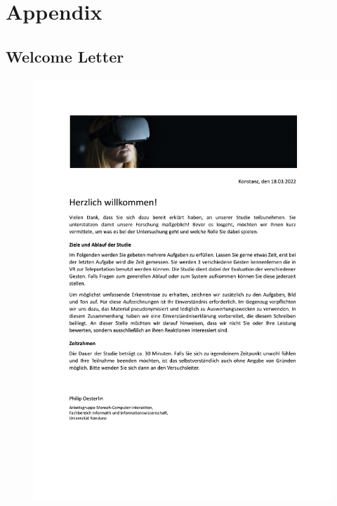 \chapter{Appendix}


\section{Welcome Letter}
\begin{figure}[!h]
\centering
\includegraphics[width=\textwidth]{figures/Appendix/welcome letter.pdf}
\end{figure}

